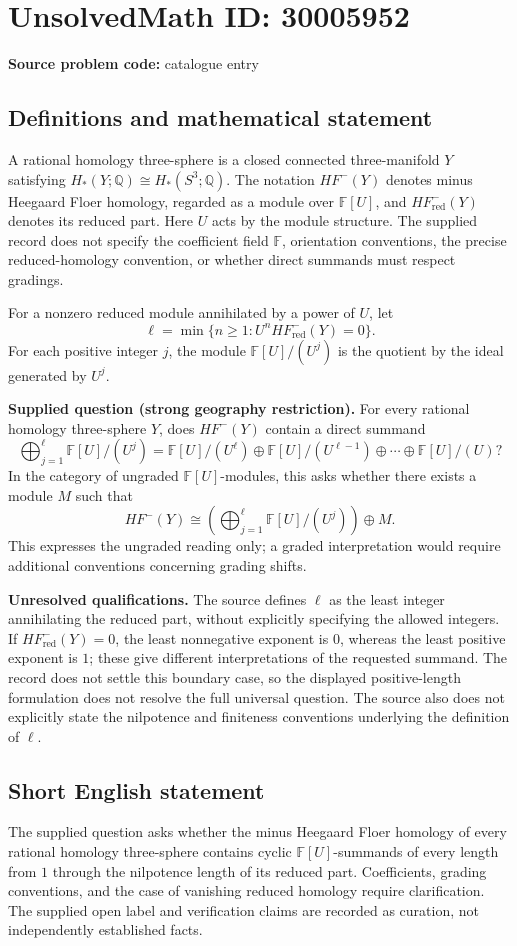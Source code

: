 \documentclass[11pt]{article}
\newcommand{\Q}{\mathbb{Q}}
\newcommand{\F}{\mathbb{F}}
\begin{document}
\section*{UnsolvedMath ID: 30005952}
\textbf{Source problem code:} catalogue entry
\subsection{Definitions and mathematical statement}
A rational homology three-sphere is a closed connected three-manifold \(Y\) satisfying \(H_*(Y;\Q)\cong H_*(S^3;\Q)\). The notation \(HF^-(Y)\) denotes minus Heegaard Floer homology, regarded as a module over \(\F[U]\), and \(HF^-_{\mathrm{red}}(Y)\) denotes its reduced part. Here \(U\) acts by the module structure. The supplied record does not specify the coefficient field \(\F\), orientation conventions, the precise reduced-homology convention, or whether direct summands must respect gradings.

For a nonzero reduced module annihilated by a power of \(U\), let
\[
\ell=\min\{n\geq 1: U^nHF^-_{\mathrm{red}}(Y)=0\}.
\]
For each positive integer \(j\), the module \(\F[U]/(U^j)\) is the quotient by the ideal generated by \(U^j\).

\textbf{Supplied question (strong geography restriction).} For every rational homology three-sphere \(Y\), does \(HF^-(Y)\) contain a direct summand
\[
\bigoplus_{j=1}^{\ell}\F[U]/(U^j)
=
\F[U]/(U^\ell)\oplus\F[U]/(U^{\ell-1})\oplus\cdots\oplus\F[U]/(U)?
\]
In the category of ungraded \(\F[U]\)-modules, this asks whether there exists a module \(M\) such that
\[
HF^-(Y)\cong\left(\bigoplus_{j=1}^{\ell}\F[U]/(U^j)\right)\oplus M.
\]
This expresses the ungraded reading only; a graded interpretation would require additional conventions concerning grading shifts.

\textbf{Unresolved qualifications.} The source defines \(\ell\) as the least integer annihilating the reduced part, without explicitly specifying the allowed integers. If \(HF^-_{\mathrm{red}}(Y)=0\), the least nonnegative exponent is \(0\), whereas the least positive exponent is \(1\); these give different interpretations of the requested summand. The record does not settle this boundary case, so the displayed positive-length formulation does not resolve the full universal question. The source also does not explicitly state the nilpotence and finiteness conventions underlying the definition of \(\ell\).
\subsection{Short English statement}
The supplied question asks whether the minus Heegaard Floer homology of every rational homology three-sphere contains cyclic \(\F[U]\)-summands of every length from \(1\) through the nilpotence length of its reduced part. Coefficients, grading conventions, and the case of vanishing reduced homology require clarification. The supplied open label and verification claims are recorded as curation, not independently established facts.
\end{document}
